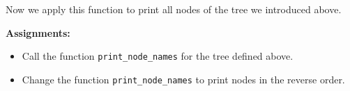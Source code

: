 Now we apply this function to print all nodes of the tree we introduced above.
\bigskip
\begin{tcolorbox}
\textbf{Assignments:}
\begin{itemize}
\item Call the function \lstinline{print_node_names}
for the tree defined above. 
\item Change the function \lstinline{print_node_names}
to print nodes in the reverse order.
\end{itemize}
\end{tcolorbox}


